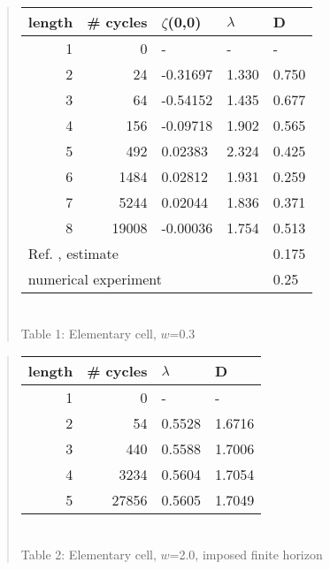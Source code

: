 \documentclass[pre,twocolumn,groupedaddress,showpacs,showkeys]{revtex4}
\begin{document}
\newpage

\begin{quote} \begin{center}
\begin{tabular}{|r|r|l|l|l|}
\hline
length & \# cycles & $\zeta$(0,0) & $\lambda$ & D \\ \hline\hline
1      & 0      &   -    &   -  &   - \\
2      & 24     & -0.31697 & 1.330 & 0.750\\
3      & 64     & -0.54152 & 1.435 & 0.677\\
4      & 156    & -0.09718 & 1.902 & 0.565\\
5      & 492    &  0.02383 & 2.324 & 0.425\\
6      & 1484   &  0.02812 & 1.931 & 0.259\\
7      & 5244   &  0.02044 & 1.836 & 0.371\\
8      & 19008  & -0.00036 & 1.754 & 0.513\\ \hline\hline
\multicolumn{4}{|l|}{Ref. \cite{MZ}, estimate} & 0.175 \\
\multicolumn{4}{|l|}{numerical experiment} & 0.25 \\ \hline
\end{tabular}\\[10pt]
{Table 1: Elementary cell, $w$=0.3}
\end{center}\end{quote}

\begin{quote} \begin{center}
\begin{tabular}{|r|r|l|l|}
\hline
length & \# cycles & $\lambda$ & D \\ \hline\hline
1      & 0      &   -    &    - \\
2 &     54      & 0.5528 &  1.6716\\
3 &    440      & 0.5588 &  1.7006\\
4 &   3234      & 0.5604 &  1.7054\\
5 &  27856      & 0.5605 &  1.7049\\ \hline
\end{tabular}\\[10pt]
{Table 2: Elementary cell, $w$=2.0, imposed finite horizon}
\end{center}\end{quote}
\end{document}
